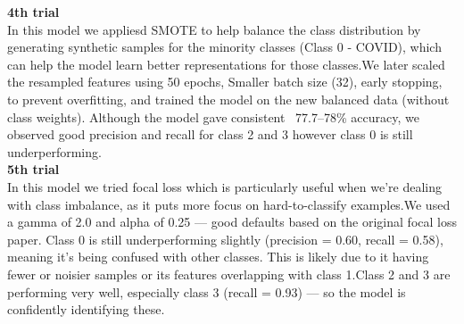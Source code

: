 \documentclass{article}
\begin{document}
\textbf{4th trial }\\
In this model we appliesd SMOTE to help balance the class distribution by generating synthetic samples for the minority classes (Class 0 - COVID), which can help the model learn better representations for those classes.We later scaled the resampled features using 50 epochs, Smaller batch size (32), early stopping, to prevent overfitting, and trained the model on the new balanced data (without class weights). Although the model gave consistent ~77.7–78\% accuracy, we observed good precision and recall for class 2 and 3 however class 0 is still underperforming.\\

\textbf{5th trial }\\
In this model we tried focal loss which is particularly useful when we're dealing with class imbalance, as it puts more focus on hard-to-classify examples.We used a gamma of 2.0 and alpha of 0.25 — good defaults based on the original focal loss paper. Class 0 is still underperforming slightly (precision = 0.60, recall = 0.58), meaning it's being confused with other classes. This is likely due to it having fewer or noisier samples or its features overlapping with class 1.Class 2 and 3 are performing very well, especially class 3 (recall = 0.93) — so the model is confidently identifying these.\\
\end{document}
